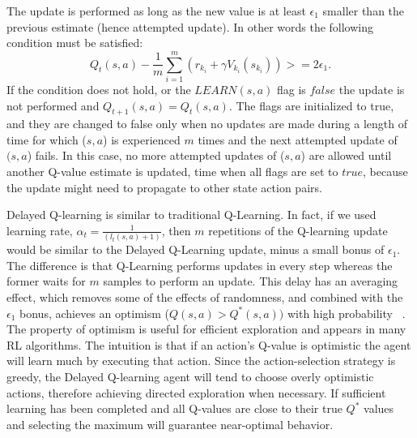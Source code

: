 The update is performed as long as the new value is at least $\epsilon_1$ smaller than the previous estimate (hence attempted update). In other words the following condition must be satisfied:
\begin{equation}
	Q_t(s,a)- \frac{1}{m}\sum_{i=1}^{m}(r_{k_i}+ \gamma V_{k_i}(s_{k_i})) >=2 \epsilon_1.
\end{equation}
If the condition does not hold, or the $LEARN(s,a)$ flag is $false$ the update is not performed and $Q_{t+1}(s,a)=Q_t(s,a)$. The flags are initialized to true, and they are changed to false only when no updates are made during a length of time for which ($s, a$) is experienced $m$ times and the next attempted update of $(s, a$) fails. In this case, no more attempted updates of ($s, a$) are allowed until another Q-value estimate is updated, time when all flags are set to $true$, because the update might need to propagate to other state action pairs.\par
Delayed Q-learning is similar to traditional Q-Learning. In fact, if we used learning rate, $\alpha_t=\frac{1}{(l_t(s,a)+1)}$, then $m$ repetitions of the Q-learning update would be similar to the Delayed Q-Learning update, minus a small bonus of $\epsilon_1$. The difference is that Q-Learning performs updates in every step whereas the former waits for $m$ samples to perform an update. This delay has an averaging effect, which removes some of the effects of randomness, and combined with the $\epsilon_1$ bonus, achieves an optimism ($Q(s,a)>Q^*(s,a))$ with high probability ~\cite{Strehl:2006:PMR:1143844.1143955}. The property of optimism is useful for efficient exploration and appears in many RL algorithms. The intuition is that if an action’s Q-value is optimistic the agent will learn much by executing that action. Since the action-selection strategy is greedy, the Delayed Q-learning agent will tend to choose overly optimistic actions, therefore achieving directed exploration when necessary. If sufficient learning has been completed and all Q-values are close to their true $Q^*$ values and selecting the maximum will guarantee near-optimal behavior.
